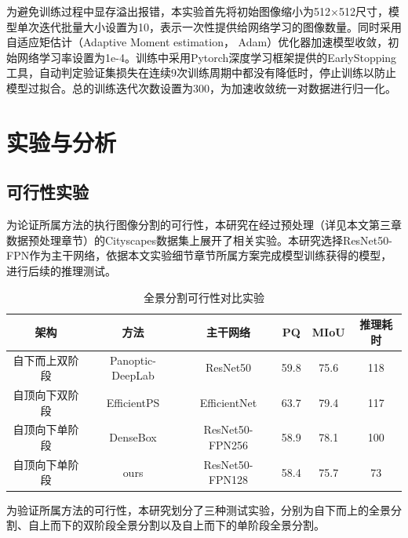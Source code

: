 为避免训练过程中显存溢出报错，本实验首先将初始图像缩小为512×512尺寸，模型单次迭代批量大小设置为10，表示一次性提供给网络学习的图像数量。同时采用自适应矩估计（Adaptive Moment estimation， Adam）优化器加速模型收敛，初始网络学习率设置为1e-4。训练中采用Pytorch深度学习框架提供的EarlyStopping工具，自动判定验证集损失在连续9次训练周期中都没有降低时，停止训练以防止模型过拟合。总的训练迭代次数设置为300，为加速收敛统一对数据进行归一化。

\section{实验与分析}

\subsection{可行性实验}
为论证所属方法的执行图像分割的可行性，本研究在经过预处理（详见本文第三章数据预处理章节）的Cityscapes数据集上展开了相关实验。本研究选择ResNet50-FPN作为主干网络，依据本文实验细节章节所属方案完成模型训练获得的模型，进行后续的推理测试。


\begin{table}[htb]
    \caption{全景分割可行性对比实验}
    \centering
    \begin{tabular}{cccccc}
        \toprule
        架构      & 方法               & 主干网络            & PQ   & MIoU & 推理耗时 \\
        \midrule
        自下而上双阶段 & Panoptic-DeepLab & ResNet50        & 59.8 & 75.6 & 118  \\
        自顶向下双阶段 & EfficientPS      & EfficientNet    & 63.7 & 79.4 & 117  \\
        自顶向下单阶段 & DenseBox         & ResNet50-FPN256 & 58.9 & 78.1 & 100  \\
        自顶向下单阶段 & ours             & ResNet50-FPN128 & 58.4 & 75.7 & 73   \\
        \bottomrule
    \end{tabular}
    \label{tab:3.3.1}
\end{table}
为验证所属方法的可行性，本研究划分了三种测试实验，分别为自下而上的全景分割、自上而下的双阶段全景分割以及自上而下的单阶段全景分割。

